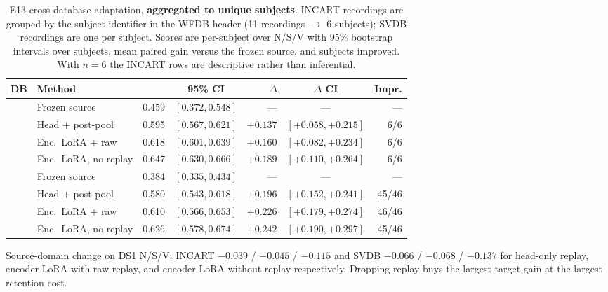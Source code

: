 \begin{table}[H]
\centering
\small
\caption{E13 cross-database adaptation, \textbf{aggregated to unique subjects}.
INCART recordings are grouped by the subject identifier in the WFDB header
(11 recordings $\rightarrow$ 6 subjects); SVDB recordings are one per subject.
Scores are per-subject \macrof{} over N/S/V with 95\% bootstrap intervals over
subjects, mean paired gain versus the frozen source, and subjects improved. With
$n = 6$ the INCART rows are descriptive rather than inferential.}
\label{tab:e13_crossdb}
\setlength{\tabcolsep}{3.5pt}
\begin{tabular}{llrcrcr}
\toprule
DB & Method & \macrof{} & 95\% CI & $\Delta$ & $\Delta$ CI & Impr. \\
\midrule
{}
 & Frozen source         & 0.459 & $[0.372,0.548]$ & ---      & ---                 & ---  \\
 & Head $+$ post-pool     & 0.595 & $[0.567,0.621]$ & $+0.137$ & $[+0.058,+0.215]$   & 6/6  \\
 & Enc.\ LoRA $+$ raw    & 0.618 & $[0.601,0.639]$ & $+0.160$ & $[+0.082,+0.234]$   & 6/6  \\
 & Enc.\ LoRA, no replay & 0.647 & $[0.630,0.666]$ & $+0.189$ & $[+0.110,+0.264]$   & 6/6  \\
\midrule
{}
 & Frozen source         & 0.384 & $[0.335,0.434]$ & ---      & ---                 & ---   \\
 & Head $+$ post-pool     & 0.580 & $[0.543,0.618]$ & $+0.196$ & $[+0.152,+0.241]$   & 45/46 \\
 & Enc.\ LoRA $+$ raw    & 0.610 & $[0.566,0.653]$ & $+0.226$ & $[+0.179,+0.274]$   & 46/46 \\
 & Enc.\ LoRA, no replay & 0.626 & $[0.578,0.674]$ & $+0.242$ & $[+0.190,+0.297]$   & 45/46 \\
\bottomrule
\end{tabular}

\vspace{0.4em}
{\small Source-domain \macrof{} change on DS1 N/S/V: INCART
$-0.039$ / $-0.045$ / $-0.115$ and SVDB $-0.066$ / $-0.068$ / $-0.137$ for
head-only replay, encoder LoRA with raw replay, and encoder LoRA without replay
respectively. Dropping replay buys the largest target gain at the largest
retention cost.}
\end{table}
